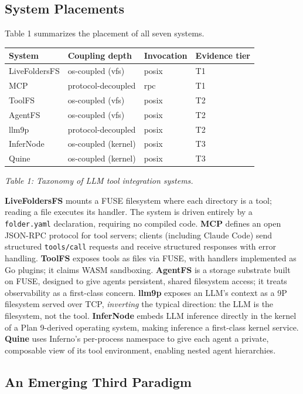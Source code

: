 \documentclass[
  11pt,
]{article}
\begin{document}
\hypertarget{system-placements}{%
\subsection{System Placements}\label{system-placements}}

Table 1 summarizes the placement of all seven systems.

\begin{longtable}[]{@{}llll@{}}
\toprule
System & Coupling depth & Invocation & Evidence tier \\
\midrule
\endhead
LiveFoldersFS & os-coupled (vfs) & posix & T1 \\
MCP & protocol-decoupled & rpc & T1 \\
ToolFS & os-coupled (vfs) & posix & T2 \\
AgentFS & os-coupled (vfs) & posix & T2 \\
llm9p & protocol-decoupled & posix & T2 \\
InferNode & os-coupled (kernel) & posix & T3 \\
Quine & os-coupled (kernel) & posix & T3 \\
\bottomrule
\end{longtable}

\emph{Table 1: Taxonomy of LLM tool integration systems.}

\textbf{LiveFoldersFS} mounts a FUSE filesystem where each directory is
a tool; reading a file executes its handler. The system is driven
entirely by a \texttt{folder.yaml} declaration, requiring no compiled
code. \textbf{MCP} defines an open JSON-RPC protocol for tool servers;
clients (including Claude Code) send structured \texttt{tools/call}
requests and receive structured responses with error handling.
\textbf{ToolFS} exposes tools as files via FUSE, with handlers
implemented as Go plugins; it claims WASM sandboxing. \textbf{AgentFS}
is a storage substrate built on FUSE, designed to give agents
persistent, shared filesystem access; it treats observability as a
first-class concern. \textbf{llm9p} exposes an LLM's context as a 9P
filesystem served over TCP, \emph{inverting} the typical direction: the
LLM is the filesystem, not the tool. \textbf{InferNode} embeds LLM
inference directly in the kernel of a Plan 9-derived operating system,
making inference a first-class kernel service. \textbf{Quine} uses
Inferno's per-process namespace to give each agent a private, composable
view of its tool environment, enabling nested agent hierarchies.

\hypertarget{an-emerging-third-paradigm}{%
\subsection{An Emerging Third
Paradigm}\label{an-emerging-third-paradigm}}
\end{document}
